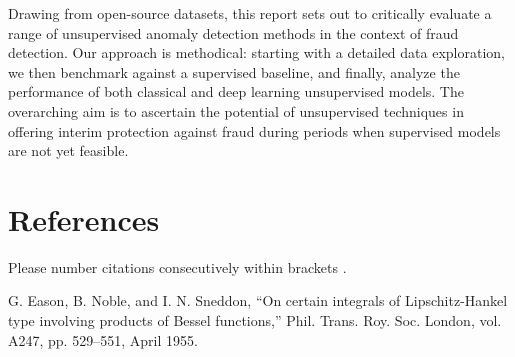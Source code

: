 \documentclass[conference]{IEEEtran}
\begin{document}
Drawing from open-source datasets, this report sets out to critically evaluate a range of unsupervised anomaly detection methods in the context of fraud detection. Our approach is methodical: starting with a detailed data exploration, we then benchmark against a supervised baseline, and finally, analyze the performance of both classical and deep learning unsupervised models. The overarching aim is to ascertain the potential of unsupervised techniques in offering interim protection against fraud during periods when supervised models are not yet feasible.






\section*{References}

Please number citations consecutively within brackets \cite{b1}.

\begin{thebibliography}{00}
     G. Eason, B. Noble, and I. N. Sneddon, ``On certain integrals of Lipschitz-Hankel type involving products of Bessel functions,'' Phil. Trans. Roy. Soc. London, vol. A247, pp. 529--551, April 1955.
\end{thebibliography}
\end{document}
